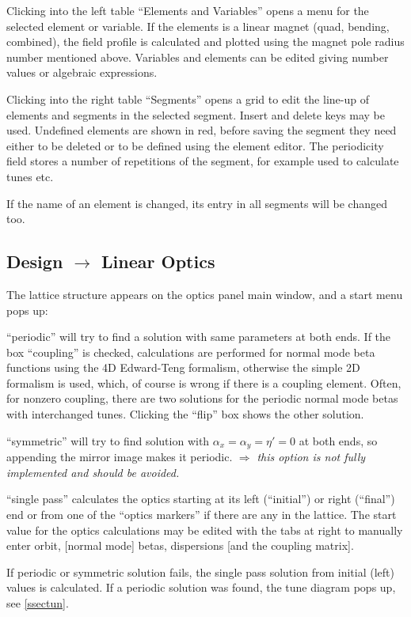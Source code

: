 \documentclass[12pt]{article}
\newcommand\todo[1]{$\Longrightarrow$ {\em #1} }
\begin{document}
Clicking into the left table ``Elements and Variables'' opens a menu for the selected element or variable. If the elements is a linear magnet (quad, bending, combined), the field profile is calculated and plotted using the magnet pole radius number mentioned above. Variables and elements can be edited giving number values or algebraic expressions.

Clicking into the right table ``Segments'' opens a grid to edit the line-up of elements and segments in the selected segment. Insert and delete keys may be used. Undefined elements are shown in red, before
saving the segment they need either to be deleted or to be defined using the element editor. The periodicity field stores a number of repetitions of the segment, for example used to calculate tunes etc.

If the name of an element is changed, its entry in all segments will be changed too.


\subsection{Design $\longrightarrow$ Linear Optics}

The lattice structure appears on the optics panel main window, and a start menu pops up:

``periodic'' will try to find a solution with same parameters at both ends. If the box ``coupling'' is checked, calculations are performed for normal mode beta functions using the 4D Edward-Teng formalism, otherwise the simple 2D formalism is used, which, of course is wrong if there is a coupling element. Often, for nonzero coupling, there are two solutions for the periodic normal mode betas with interchanged tunes. Clicking the ``flip'' box shows the other solution.

``symmetric'' will try to find solution with $\alpha_x=\alpha_y=\eta'=0$
at both ends, so appending the mirror image makes it periodic. 
\todo{this option is not fully implemented and should be avoided.}

``single pass''  calculates the optics starting at its left (``initial'') or
right (``final'') end or from one of the ``optics markers'' if there are any in the lattice.
The start value for the optics calculations may be edited with the tabs at right to manually enter orbit, [normal mode] betas, dispersions [and the coupling matrix].

If periodic or symmetric solution fails, the single pass solution from initial (left)
values is calculated. If a periodic solution was found, the tune diagram pops up, see \ref{ssectun}.\\
\end{document}
